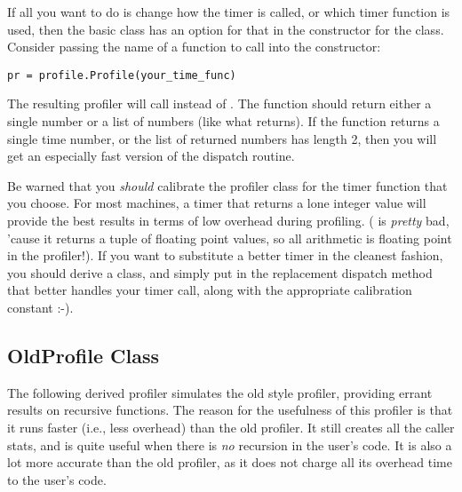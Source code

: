 If all you want to do is change how the timer is called, or which
timer function is used, then the basic class has an option for that in
the constructor for the class.  Consider passing the name of a
function to call into the constructor:

\begin{verbatim}
pr = profile.Profile(your_time_func)
\end{verbatim}

The resulting profiler will call  instead of
.  The function should return either a single number
or a list of numbers (like what  returns).  If the
function returns a single time number, or the list of returned numbers
has length 2, then you will get an especially fast version of the
dispatch routine.

Be warned that you \emph{should} calibrate the profiler class for the
timer function that you choose.  For most machines, a timer that
returns a lone integer value will provide the best results in terms of
low overhead during profiling.  ( is
\emph{pretty} bad, 'cause it returns a tuple of floating point values,
so all arithmetic is floating point in the profiler!).  If you want to
substitute a better timer in the cleanest fashion, you should derive a
class, and simply put in the replacement dispatch method that better
handles your timer call, along with the appropriate calibration
constant :-).


\subsection{OldProfile Class \label{profile-old}}

The following derived profiler simulates the old style profiler,
providing errant results on recursive functions. The reason for the
usefulness of this profiler is that it runs faster (i.e., less
overhead) than the old profiler.  It still creates all the caller
stats, and is quite useful when there is \emph{no} recursion in the
user's code.  It is also a lot more accurate than the old profiler, as
it does not charge all its overhead time to the user's code.

